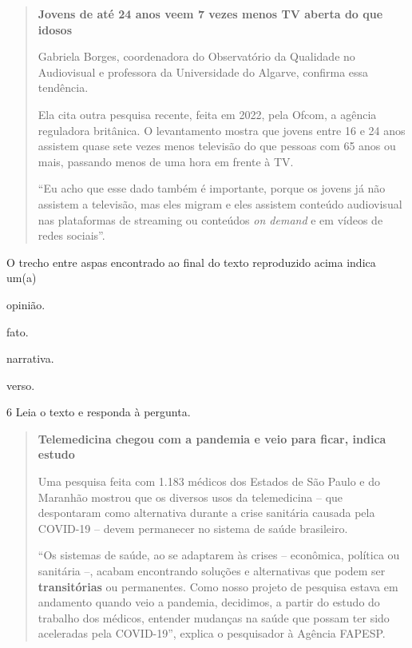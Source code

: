 \begin{quote}
\textbf{Jovens de até 24 anos veem 7 vezes menos TV aberta do que idosos}

Gabriela Borges, coordenadora do Observatório da Qualidade no
Audiovisual e professora da Universidade do Algarve, confirma essa
tendência.

Ela cita outra pesquisa recente, feita em 2022, pela Ofcom, a agência
reguladora britânica. O levantamento mostra que jovens entre 16 e 24
anos assistem quase sete vezes menos televisão do que pessoas com 65
anos ou mais, passando menos de uma hora em frente à TV.

``Eu acho que esse dado também é importante, porque os jovens já não
assistem a televisão, mas eles migram e eles assistem conteúdo
audiovisual nas plataformas de streaming ou conteúdos \textit{on demand}
e em vídeos de redes sociais''.

\end{quote}

O trecho entre aspas encontrado ao final do texto reproduzido acima
indica um(a)

\begin{escolha}
  \item opinião.

  \item fato.

  \item narrativa.

  \item verso.
\end{escolha}

\pagebreak
\num{6} Leia o texto e responda à pergunta.

\begin{quote}
\textbf{Telemedicina chegou com a pandemia e veio para ficar, indica estudo}

Uma pesquisa feita com 1.183 médicos dos Estados de São Paulo e do
Maranhão mostrou que os diversos usos da telemedicina -- que despontaram
como alternativa durante a crise sanitária causada pela COVID-19 --
devem permanecer no sistema de saúde brasileiro.

``Os sistemas de saúde, ao se adaptarem às crises -- econômica, política
ou sanitária --, acabam encontrando soluções e alternativas que podem
ser \textbf{transitórias} ou permanentes. Como nosso projeto de pesquisa
estava em andamento quando veio a pandemia, decidimos, a partir do
estudo do trabalho dos médicos, entender mudanças na saúde que possam
ter sido aceleradas pela COVID-19'', explica o pesquisador à Agência
FAPESP.

\end{quote}

